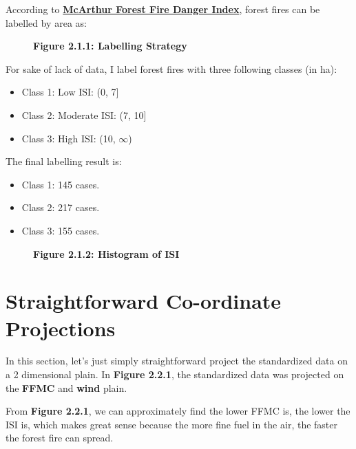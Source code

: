 \documentclass[titlepage,a4paper,12pt,thmsb]{report}
\begin{document}
According to {\bf \href{https://en.wikipedia.org/wiki/McArthur_Forest_Fire_Danger_Index}{McArthur Forest Fire Danger Index}}, forest fires can be labelled by area as:

\begin{center}
    \begin{figure}[h]
        {\par}
        {\bf{Figure 2.1.1: Labelling Strategy }}
    \end{figure}
\end{center}


\newpage

For sake of lack of data, I label forest fires with three following classes (in ha):

\begin{itemize}
\item{Class 1: Low ISI: (0, 7]}
\item{Class 2: Moderate ISI: (7, 10]}
\item{Class 3: High ISI: (10, $\infty$)}
\end{itemize}

The final labelling result is:

\begin{itemize}
\item{Class 1: 145 cases.}
\item{Class 2: 217 cases.}
\item{Class 3: 155 cases.}
\end{itemize}

\begin{center}
\begin{figure}[h]
{\par}
{\bf{Figure 2.1.2: Histogram of ISI }}
\end{figure}
\end{center}

\newpage

\section{Straightforward Co-ordinate Projections}

In this section, let's just simply straightforward project the standardized data on a 2 dimensional plain. In {\bf{Figure 2.2.1}}, the standardized data was projected on the {\bf{FFMC}} and {\bf{wind}} plain.

From {\bf{Figure 2.2.1}}, we can approximately find the lower FFMC is, the lower the ISI is, which makes great sense because the more fine fuel in the air, the faster the forest fire can spread.
\end{document}
